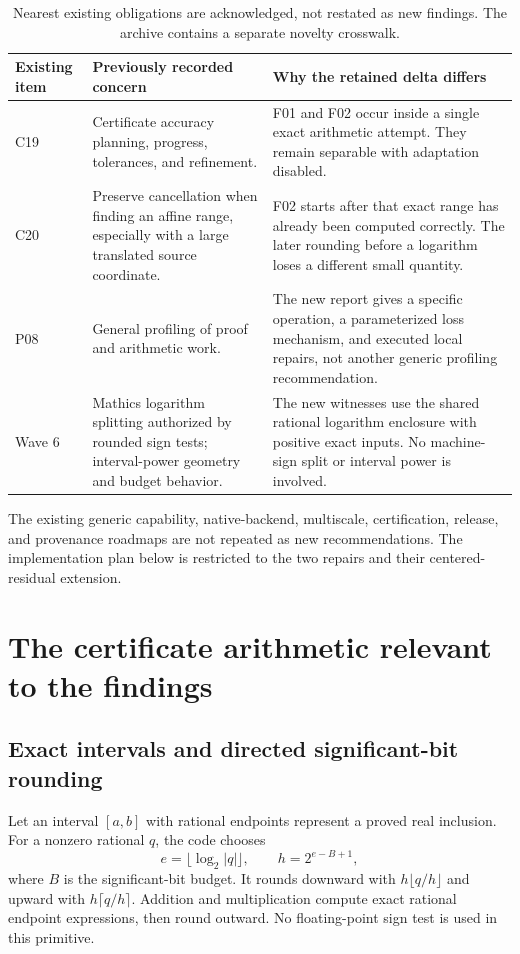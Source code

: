 \documentclass[11pt,letterpaper]{article}
\theoremstyle{remark}\newtheorem{remark}[proposition]{Remark}
\begin{document}
\begin{table}[htbp]
\centering\small
\begin{tabularx}{\textwidth}{@{}p{1.0in}YY@{}}
\toprule
Existing item & Previously recorded concern & Why the retained delta differs \\
\midrule
C19 & Certificate accuracy planning, progress, tolerances, and refinement. &
F01 and F02 occur inside a single exact arithmetic attempt. They remain
separable with adaptation disabled. \\
C20 & Preserve cancellation when finding an affine range, especially with a
large translated source coordinate. & F02 starts after that exact range has
already been computed correctly. The later rounding before a logarithm
loses a different small quantity. \\
P08 & General profiling of proof and arithmetic work. & The new report gives
a specific operation, a parameterized loss mechanism, and executed local
repairs, not another generic profiling recommendation. \\
Wave 6 & Mathics logarithm splitting authorized by rounded sign tests;
interval-power geometry and budget behavior. & The new witnesses use the
shared rational logarithm enclosure with positive exact inputs. No
machine-sign split or interval power is involved. \\
\bottomrule
\end{tabularx}
\caption{Nearest existing obligations are acknowledged, not restated as new
findings. The archive contains a separate novelty crosswalk.}
\end{table}

The existing generic capability, native-backend, multiscale, certification,
release, and provenance roadmaps are not repeated as new recommendations.
The implementation plan below is restricted to the two repairs and their
centered-residual extension.

\section{The certificate arithmetic relevant to the findings}
\subsection{Exact intervals and directed significant-bit rounding}
Let an interval $[a,b]$ with rational endpoints represent a proved real
inclusion. For a nonzero rational $q$, the code chooses
\[
 e=\lfloor\log_2|q|\rfloor,\qquad h=2^{e-B+1},
\]
where $B$ is the significant-bit budget. It rounds downward with
$h\lfloor q/h\rfloor$ and upward with $h\lceil q/h\rceil$.
Addition and multiplication compute exact rational endpoint expressions,
then round outward. No floating-point sign test is used in this
primitive.\cite{certsource}
\end{document}

